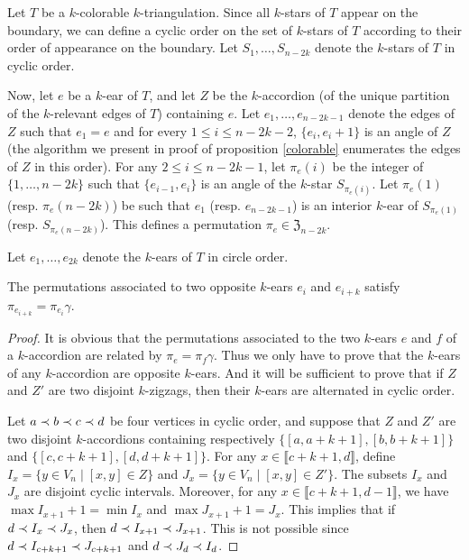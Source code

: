 \documentclass[12pt]{amsart}
\begin{document}
Let $T$ be a $k$-colorable $k$-triangulation.
Since all $k$-stars of $T$ appear on the boundary, we can define a cyclic order on the set of $k$-stars of $T$ according to their order of appearance on the boundary.
Let $S_1,\ldots,S_{n-2k}$ denote the $k$-stars of $T$ in cyclic order.

Now, let $e$ be a $k$-ear of $T$, and let $Z$ be the $k$-accordion (of the unique partition of the $k$-relevant edges of $T$) containing $e$.
Let $e_1,\ldots, e_{n-2k-1}$ denote the edges of $Z$ such that $e_1=e$ and for every $1\le i\le n-2k-2$, $\{e_i,e_i+1\}$ is an angle of $Z$ (the algorithm we present in proof of proposition \ref{colorable} enumerates the edges of $Z$ in this order).
For any $2\le i\le n-2k-1$, let $\pi_e(i)$ be the integer of $\{1,\ldots,n-2k\}$ such that $\{e_{i-1},e_i\}$ is an angle of the $k$-star $S_{\pi_e(i)}$.
Let $\pi_e(1)$ (resp. $\pi_e(n-2k)$) be such that $e_1$ (resp. $e_{n-2k-1}$) is an interior $k$-ear of $S_{\pi_e(1)}$ (resp. $S_{\pi_e(n-2k)}$).
This defines a permutation $\pi_e\in \mathfrak{Z}_{n-2k}$.


Let $e_1,\ldots,e_{2k}$ denote the $k$-ears of $T$ in circle order.

\begin{lemma}
The permutations associated to two opposite $k$-ears $e_i$ and $e_{i+k}$ satisfy $\pi_{e_{i+k}}=\pi_{e_i}\gamma$.
\end{lemma}

\begin{proof}
It is obvious that the permutations associated to the two $k$-ears $e$ and $f$ of a $k$-accordion are related by $\pi_e=\pi_f\gamma$. Thus we only have to prove that the $k$-ears of any $k$-accordion are opposite $k$-ears. And it will be sufficient to prove that if $Z$ and $Z'$ are two disjoint $k$-zigzags, then their $k$-ears are alternated in cyclic order.

Let $a \prec b\prec c \prec d$ be four vertices in cyclic order, and suppose that $Z$ and $Z'$ are two disjoint $k$-accordions containing respectively $\{[a,a+k+1],[b,b+k+1]\}$ and $\{[c,c+k+1],[d,d+k+1]\}$. For any $x\in\llbracket c+k+1,d\rrbracket$, define $I_x=\{y\in V_n\;|\; [x,y]\in Z\}$ and $J_x=\{y\in V_n\;|\; [x,y]\in Z'\}$. The subsets $I_x$ and $J_x$ are disjoint cyclic intervals. Moreover, for any $x\in\llbracket c+k+1,d-1\rrbracket$, we have $\max I_{x+1}+1=\min I_x$ and $\max J_{x+1}+1= J_x$. This implies that if $d\prec I_x\prec J_x$, then $d\prec I_{x+1}\prec J_{x+1}$. This is not possible since $d\prec I_{c+k+1}\prec J_{c+k+1}$ and $d\prec J_d\prec I_d$.
\end{proof}
\end{document}

